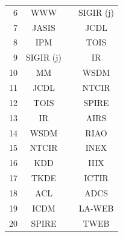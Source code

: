 \begin{table}[htbp]
\begin{tabular}{rccc}
6		&	WWW			&	&	SIGIR (j)	\\
7		&	JASIS		&	&	JCDL		\\
8		&	IPM			&	&	TOIS		\\
9		&	SIGIR (j)	&	&	IR			\\
10		&	MM			&	&	WSDM		\\
11		&	JCDL		&	&	NTCIR		\\
12		&	TOIS		&	&	SPIRE		\\
13		&	IR			&	&	AIRS		\\
14		&	WSDM		&	&	RIAO		\\
15		&	NTCIR		&	&	INEX		\\
16		&	KDD			&	&	IIIX		\\
17		&	TKDE		&	&	ICTIR		\\
18		&	ACL			&	&	ADCS		\\
19		&	ICDM		&	&	LA-WEB		\\
20		&	SPIRE		&	&	TWEB		\\
\bottomrule
\end{tabular}
\end{table}



